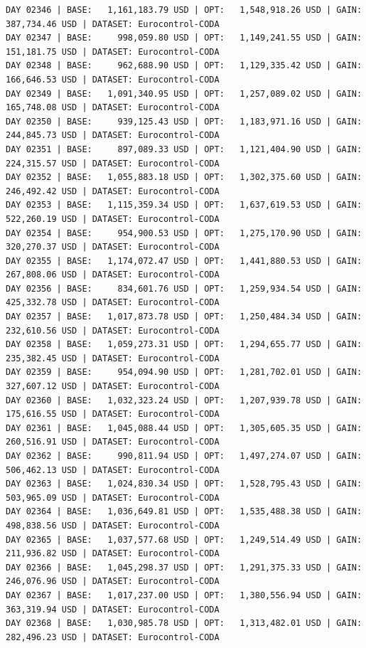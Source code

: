 \documentclass[11pt,a4paper]{article}
\begin{document}
\begin{verbatim}
DAY 02346 | BASE:   1,161,183.79 USD | OPT:   1,548,918.26 USD | GAIN: 387,734.46 USD | DATASET: Eurocontrol-CODA
DAY 02347 | BASE:     998,059.80 USD | OPT:   1,149,241.55 USD | GAIN: 151,181.75 USD | DATASET: Eurocontrol-CODA
DAY 02348 | BASE:     962,688.90 USD | OPT:   1,129,335.42 USD | GAIN: 166,646.53 USD | DATASET: Eurocontrol-CODA
DAY 02349 | BASE:   1,091,340.95 USD | OPT:   1,257,089.02 USD | GAIN: 165,748.08 USD | DATASET: Eurocontrol-CODA
DAY 02350 | BASE:     939,125.43 USD | OPT:   1,183,971.16 USD | GAIN: 244,845.73 USD | DATASET: Eurocontrol-CODA
DAY 02351 | BASE:     897,089.33 USD | OPT:   1,121,404.90 USD | GAIN: 224,315.57 USD | DATASET: Eurocontrol-CODA
DAY 02352 | BASE:   1,055,883.18 USD | OPT:   1,302,375.60 USD | GAIN: 246,492.42 USD | DATASET: Eurocontrol-CODA
DAY 02353 | BASE:   1,115,359.34 USD | OPT:   1,637,619.53 USD | GAIN: 522,260.19 USD | DATASET: Eurocontrol-CODA
DAY 02354 | BASE:     954,900.53 USD | OPT:   1,275,170.90 USD | GAIN: 320,270.37 USD | DATASET: Eurocontrol-CODA
DAY 02355 | BASE:   1,174,072.47 USD | OPT:   1,441,880.53 USD | GAIN: 267,808.06 USD | DATASET: Eurocontrol-CODA
DAY 02356 | BASE:     834,601.76 USD | OPT:   1,259,934.54 USD | GAIN: 425,332.78 USD | DATASET: Eurocontrol-CODA
DAY 02357 | BASE:   1,017,873.78 USD | OPT:   1,250,484.34 USD | GAIN: 232,610.56 USD | DATASET: Eurocontrol-CODA
DAY 02358 | BASE:   1,059,273.31 USD | OPT:   1,294,655.77 USD | GAIN: 235,382.45 USD | DATASET: Eurocontrol-CODA
DAY 02359 | BASE:     954,094.90 USD | OPT:   1,281,702.01 USD | GAIN: 327,607.12 USD | DATASET: Eurocontrol-CODA
DAY 02360 | BASE:   1,032,323.24 USD | OPT:   1,207,939.78 USD | GAIN: 175,616.55 USD | DATASET: Eurocontrol-CODA
DAY 02361 | BASE:   1,045,088.44 USD | OPT:   1,305,605.35 USD | GAIN: 260,516.91 USD | DATASET: Eurocontrol-CODA
DAY 02362 | BASE:     990,811.94 USD | OPT:   1,497,274.07 USD | GAIN: 506,462.13 USD | DATASET: Eurocontrol-CODA
DAY 02363 | BASE:   1,024,830.34 USD | OPT:   1,528,795.43 USD | GAIN: 503,965.09 USD | DATASET: Eurocontrol-CODA
DAY 02364 | BASE:   1,036,649.81 USD | OPT:   1,535,488.38 USD | GAIN: 498,838.56 USD | DATASET: Eurocontrol-CODA
DAY 02365 | BASE:   1,037,577.68 USD | OPT:   1,249,514.49 USD | GAIN: 211,936.82 USD | DATASET: Eurocontrol-CODA
DAY 02366 | BASE:   1,045,298.37 USD | OPT:   1,291,375.33 USD | GAIN: 246,076.96 USD | DATASET: Eurocontrol-CODA
DAY 02367 | BASE:   1,017,237.00 USD | OPT:   1,380,556.94 USD | GAIN: 363,319.94 USD | DATASET: Eurocontrol-CODA
DAY 02368 | BASE:   1,030,985.78 USD | OPT:   1,313,482.01 USD | GAIN: 282,496.23 USD | DATASET: Eurocontrol-CODA

\end{verbatim}
\end{document}
